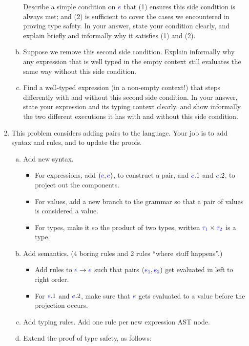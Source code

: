 \documentclass{article}
\newcommand{\meta}[1]{{\color{blue}#1}}
\begin{document}
\begin{enumerate}[leftmargin=*,itemindent=*,start=1,label={{\bf Problem \arabic*}.},ref=\arabic*]
\begin{enumerate}[(a)]
    Describe a simple condition on $\meta{e}$ that (1) ensures this side condition is always met;
    and (2) is sufficient to cover the cases we encountered in proving type safety.
    In your answer, state your condition clearly, and explain briefly and informally why it satisfies (1) and (2).
  \item Suppose we remove this second side condition. Explain informally why any
    expression that is well typed in the empty context still evaluates the same
    way without this side condition.
  \item Find a well-typed expression (in a non-empty context!) that steps
    differently with and without this second side condition.  In your answer,
    state your expression and its typing context clearly, and show informally
    the two different executions it has with and without this side condition.
  \end{enumerate}
\item This problem considers adding pairs to the language. Your job is to add syntax and rules, and to update the proofs.
  \begin{enumerate}[(a)]
  \item Add new syntax.
    \begin{itemize}
    \item For expressions, add $(\meta{e}, \meta{e})$, to construct a pair, and
      $\meta{e}.1$ and $\meta{e}.2$, to project out the components.
    \item For values, add a new branch to the grammar so that a pair of
      values is considered a value.
    \item For types, make it so the product of two types, written
      $\meta{\tau_1}\times\meta{\tau_2}$ is a type.
    \end{itemize}
  \item Add semantics. (4 boring rules and 2 rules ``where stuff happens''.)
    \begin{itemize}
    \item Add rules to $\meta{e}\to\meta{e}$ such that pairs $(\meta{e_1},\meta{e_2})$ get evaluated in left to right order.
    \item For $\meta{e}.1$ and $\meta{e}.2$, make sure that $\meta{e}$ gets evaluated to a value before the projection occurs.
    \end{itemize}
  \item Add typing rules. Add one rule per new expression AST node.
  \item Extend the proof of type safety, as follows:

\end{enumerate}
\end{enumerate}
\end{document}
